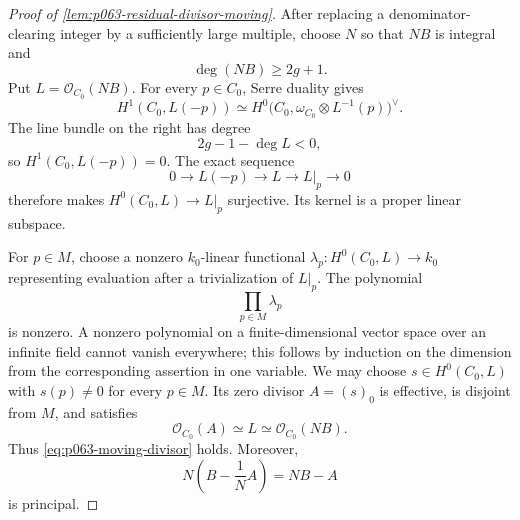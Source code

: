 \begin{proof}[Proof of \cref{lem:p063-residual-divisor-moving}]
After replacing a denominator-clearing integer by a sufficiently large
multiple, choose \(N\) so that \(NB\) is integral and
\[
                         \deg(NB)\geq2g+1.
\]
Put \(L=\mathcal O_{C_0}(NB)\).  For every \(p\in C_0\), Serre duality
gives
\[
 H^1(C_0,L(-p))
 \simeq
 H^0\bigl(C_0,\omega_{C_0}\otimes L^{-1}(p)\bigr)^\vee.
\]
The line bundle on the right has degree
\[
                   2g-1-\deg L<0,
\]
so \(H^1(C_0,L(-p))=0\).  The exact sequence
\[
 0\longrightarrow L(-p)\longrightarrow L
   \longrightarrow L|_p\longrightarrow0
\]
therefore makes \(H^0(C_0,L)\to L|_p\) surjective.  Its kernel is a
proper linear subspace.

For \(p\in M\), choose a nonzero \(k_0\)-linear functional
\(\lambda_p:H^0(C_0,L)\to k_0\) representing evaluation after a
trivialization of \(L|_p\).  The polynomial
\[
                         \prod_{p\in M}\lambda_p
\]
is nonzero.  A nonzero polynomial on a finite-dimensional vector space
over an infinite field cannot vanish everywhere; this follows by
induction on the dimension from the corresponding assertion in one
variable.  We may choose \(s\in H^0(C_0,L)\) with \(s(p)\ne0\) for every
\(p\in M\).  Its zero divisor \(A=(s)_0\) is effective, is disjoint from
\(M\), and satisfies
\[
                         \mathcal O_{C_0}(A)\simeq L
                         \simeq\mathcal O_{C_0}(NB).
\]
Thus \eqref{eq:p063-moving-divisor} holds.  Moreover,
\[
                         N\left(B-\frac1N A\right)=NB-A
\]
is principal.
\end{proof}

